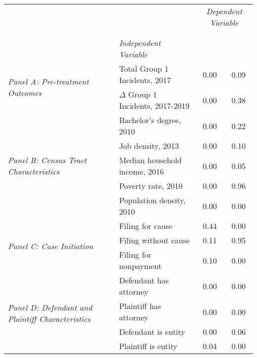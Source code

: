 \begin{tabular}{llcc}
\toprule
 &  & \multicolumn{2}{c}{\textit{Dependent Variable}} \\
\cline{3-4}
\\
 &  &  &  \\
 & \emph{Independent Variable} &  &  \\
\midrule
\multirow[c]{2}{3cm}{\textit{Panel A: Pre-treatment Outcomes}} & Total Group 1 Incidents, 2017 & 0.00 & 0.09 \\
 & $\Delta$ Group 1 Incidents, 2017-2019 & 0.00 & 0.38 \\
\cline{1-4}
\multirow[c]{5}{3cm}{\textit{Panel B: Census Tract Characteristics}} & Bachelor's degree, 2010 & 0.00 & 0.22 \\
 & Job density, 2013 & 0.00 & 0.10 \\
 & Median household income, 2016 & 0.00 & 0.05 \\
 & Poverty rate, 2010 & 0.00 & 0.96 \\
 & Population density, 2010 & 0.00 & 0.00 \\
\cline{1-4}
\multirow[c]{3}{3cm}{\textit{Panel C: Case Initiation}} & Filing for cause & 0.44 & 0.00 \\
 & Filing without cause & 0.11 & 0.95 \\
 & Filing for nonpayment & 0.10 & 0.00 \\
\cline{1-4}
\multirow[c]{4}{3cm}{\textit{Panel D: Defendant and Plaintiff Characteristics}} & Defendant has attorney & 0.00 & 0.00 \\
 & Plaintiff has attorney & 0.00 & 0.00 \\
 & Defendant is entity & 0.00 & 0.06 \\
 & Plaintiff is entity & 0.04 & 0.00 \\
\cline{1-4}
\bottomrule
\end{tabular}
